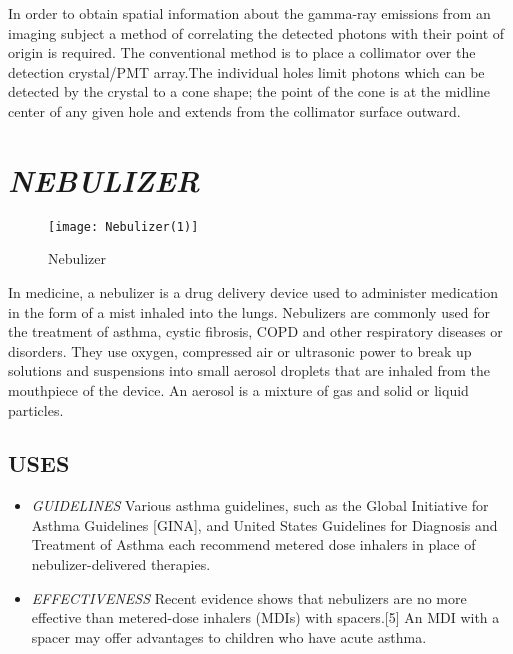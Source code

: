 \documentclass[12pt]{article}
\begin{document}
In order to obtain spatial information about the gamma-ray emissions from an imaging subject  a method of correlating the detected photons with their point of origin is required.\newline
The conventional method is to place a collimator over the detection crystal/PMT array.The individual holes limit photons which can be detected by the crystal to a cone shape; the point of the cone is at the midline center of any given hole and extends from the collimator surface outward.

\newpage
\section {\textsl{NEBULIZER}}
\begin{figure}
\centering
\texttt{[image: Nebulizer(1)]}
\caption{Nebulizer}
\end{figure}

In medicine, a nebulizer is a drug delivery device used to administer medication in the form of a mist inhaled into the lungs. Nebulizers are commonly used for the treatment of asthma, cystic fibrosis, COPD and other respiratory diseases or disorders.\newline\newline
They use oxygen, compressed air or ultrasonic power to break up solutions and suspensions into small aerosol droplets that are inhaled from the mouthpiece of the device. An aerosol is a mixture of gas and solid or liquid particles.

\subsection{USES}
\begin{itemize}
\item \textsl{GUIDELINES}\newline
Various asthma guidelines, such as the Global Initiative for Asthma Guidelines [GINA], and United States Guidelines for Diagnosis and Treatment of Asthma each recommend metered dose inhalers in place of nebulizer-delivered therapies.
\item \textsl{EFFECTIVENESS}\newline
Recent evidence shows that nebulizers are no more effective than metered-dose inhalers (MDIs) with spacers.[5] An MDI with a spacer may offer advantages to children who have acute asthma.


\end{itemize}
\end{document}
